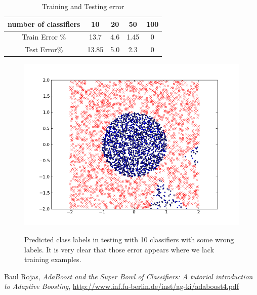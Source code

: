 \documentclass[]{article}  %
\begin{document}
\begin{table}[htdp]
\caption{Training and Testing error }
\begin{center}
\begin{tabular}{c|c|c|c|c}

number of classifiers & 10 & 20 & 50 & 100\\
\hline
Train Error \% & 13.7 & 4.6 & 1.45 & 0\\
Test Error\% & 13.85 & 5.0 & 2.3 & 0
\end{tabular}
\end{center}
\label{default}
\end{table}%

\begin{figure}[h]
\begin{center}
\includegraphics[scale=.6]{10c.png}\label{fig:axis}
\end{center}
\caption{Predicted class labels in testing with 10 classifiers with some wrong labels. It is very clear that those error appears where we lack training examples. }
\end{figure}%

\begin{thebibliography}{9}

 Baul Rojas, \emph{AdaBoost and the Super Bowl of Classifiers: A tutorial introduction to Adaptive Boosting}, \url{http://www.inf.fu-berlin.de/inst/ag-ki/adaboost4.pdf}


\end{thebibliography}
\end{document}
